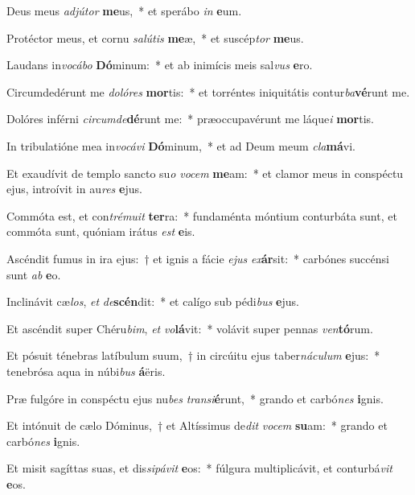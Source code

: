 \item Deus meus \textit{ad}\textit{jú}\textit{tor} \textbf{me}us,~* et sperábo \textit{in} \textbf{e}um.
\item Protéctor meus, et cornu \textit{sa}\textit{lú}\textit{tis} \textbf{me}æ,~* et suscép\textit{tor} \textbf{me}us.
\item Laudans in\textit{vo}\textit{cá}\textit{bo} \textbf{Dó}minum:~* et ab inimícis meis sal\textit{vus} \textbf{e}ro.
\item Circumdedérunt me \textit{do}\textit{ló}\textit{res} \textbf{mor}tis:~* et torréntes iniquitátis contur\textit{ba}\textbf{vé}runt me.
\item Dolóres inférni \textit{cir}\textit{cum}\textit{de}\textbf{dé}runt me:~* præoccupavérunt me láque\textit{i} \textbf{mor}tis.
\item In tribulatióne mea in\textit{vo}\textit{cá}\textit{vi} \textbf{Dó}minum,~* et ad Deum meum \textit{cla}\textbf{má}vi.
\item Et exaudívit de templo sancto su\textit{o} \textit{vo}\textit{cem} \textbf{me}am:~* et clamor meus in conspéctu ejus, introívit in au\textit{res} \textbf{e}jus.
\item Commóta est, et con\textit{tré}\textit{mu}\textit{it} \textbf{ter}ra:~* fundaménta móntium conturbáta sunt, et commóta sunt, quóniam irátus \textit{est} \textbf{e}is.
\item Ascéndit fumus in ira ejus:~† et ignis a fácie \textit{e}\textit{jus} \textit{ex}\textbf{ár}sit:~* carbónes succénsi sunt \textit{ab} \textbf{e}o.
\item Inclinávit cæ\textit{los}, \textit{et} \textit{de}\textbf{scén}dit:~* et calígo sub pédi\textit{bus} \textbf{e}jus.
\item Et ascéndit super Chéru\textit{bim}, \textit{et} \textit{vo}\textbf{lá}vit:~* volávit super pennas \textit{ven}\textbf{tó}rum.
\item Et pósuit ténebras latíbulum suum,~† in circúitu ejus taber\textit{ná}\textit{cu}\textit{lum} \textbf{e}jus:~* tenebrósa aqua in núbi\textit{bus} \textbf{á}ëris.
\item Præ fulgóre in conspéctu ejus nu\textit{bes} \textit{trans}\textit{i}\textbf{é}runt,~* grando et carbó\textit{nes} \textbf{i}gnis.
\item Et intónuit de cælo Dóminus,~† et Altíssimus de\textit{dit} \textit{vo}\textit{cem} \textbf{su}am:~* grando et carbó\textit{nes} \textbf{i}gnis.
\item Et misit sagíttas suas, et dis\textit{si}\textit{pá}\textit{vit} \textbf{e}os:~* fúlgura multiplicávit, et conturbá\textit{vit} \textbf{e}os.
